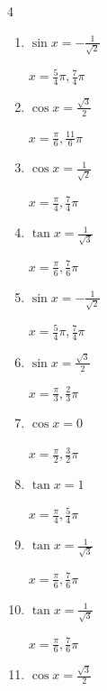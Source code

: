 \begin{multicols}{4}
\begin{enumerate}
        $\displaystyle x = \frac{\pi}{3} , \frac{2}{3}\pi$

  \item $\displaystyle \sin{x}  = -\frac{1}{\sqrt{2}}$

        $\displaystyle x = \frac{5}{4}\pi , \frac{7}{4}\pi$

  \item $\displaystyle \cos{x}  = \frac{\sqrt{3}}{2}$

        $\displaystyle x = \frac{\pi}{6} , \frac{11}{6}\pi$

  \item $\displaystyle \cos{x}  = \frac{1}{\sqrt{2}}$

        $\displaystyle x = \frac{\pi}{4} , \frac{7}{4}\pi$

  \item $\displaystyle \tan{x}  = \frac{1}{\sqrt{3}}$

        $\displaystyle x = \frac{\pi}{6} , \frac{7}{6}\pi$

  \item $\displaystyle \sin{x}  = -\frac{1}{\sqrt{2}}$

        $\displaystyle x = \frac{5}{4}\pi , \frac{7}{4}\pi$

  \item $\displaystyle \sin{x}  = \frac{\sqrt{3}}{2}$

        $\displaystyle x = \frac{\pi}{3} , \frac{2}{3}\pi$

  \item $\displaystyle \cos{x}  = 0$

        $\displaystyle x = \frac{\pi}{2} , \frac{3}{2}\pi$

\columnbreak %

\resetques

  \item $\displaystyle \tan{x}  = 1$

        $\displaystyle x = \frac{\pi}{4} , \frac{5}{4}\pi$

  \item $\displaystyle \tan{x}  = \frac{1}{\sqrt{3}}$

        $\displaystyle x = \frac{\pi}{6} , \frac{7}{6}\pi$

  \item $\displaystyle \tan{x}  = \frac{1}{\sqrt{3}}$

        $\displaystyle x = \frac{\pi}{6} , \frac{7}{6}\pi$

  \item $\displaystyle \cos{x}  = \frac{\sqrt{3}}{2}$


\end{enumerate}
\end{multicols}
